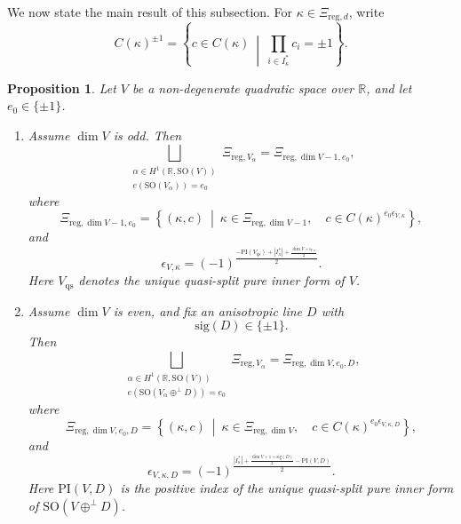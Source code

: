 \documentclass[12pt]{amsart}
\numberwithin{equation}{subsection}
\newcommand{\BR}{{\mathbb {R}}}
\newcommand{\Fi}{{\mathfrak {i}}}
\newcommand{\reg}{{\mathrm{reg}}}
\newcommand{\SO}{{\mathrm{SO}}}
\def\alp{{\alpha}}
\def\eps{{\epsilon}}
\def\qs{\mathrm{qs}}
\def\PI{\mathrm{PI}}
\def\SO{\mathrm{SO}}
\newtheorem{pro}[thm]{Proposition}
\begin{document}
We now state the main result of this subsection. For $\kappa\in \Xi_{\reg,d}$,
write
\[
C(\kappa)^{\pm 1}
=
\left\{
c\in C(\kappa)
\ \middle|\
\prod_{i\in I^*_\kappa}c_i=\pm 1
\right\}.
\]

\begin{pro}\label{pro:unionpureinnerconjclassof}
Let $V$ be a non-degenerate quadratic space over $\BR$, and let
$e_0\in \{\pm 1\}$.

\begin{enumerate}
\item
Assume $\dim V$ is odd. Then
\[
\bigsqcup_{\substack{
\alp\in H^1(\BR,\SO(V))\\
e(\SO(V_\alp))=e_0
}}
\Xi_{\reg,V_\alp}
=
\Xi_{\reg,\dim V-1,e_0},
\]
where
\[
\Xi_{\reg,\dim V-1,e_0}
=
\left\{
(\kappa,c)
\ \middle|\
\kappa\in \Xi_{\reg,\dim V-1},\quad
c\in C(\kappa)^{e_0\eps_{V,\kappa}}
\right\},
\]
and
\[
\eps_{V,\kappa}
=
(-1)^{
\frac{
-\PI(V_\qs)
+
|I^*_\kappa|
+
\frac{\dim V+\Fi_{V,\kappa}}{2}
}{2}
}.
\]
Here $V_\qs$ denotes the unique quasi-split pure inner form of $V$.

\item
Assume $\dim V$ is even, and fix an anisotropic line $D$ with
\[
\mathrm{sig}(D)\in \{\pm 1\}.
\]
Then
\[
\bigsqcup_{\substack{
\alp\in H^1(\BR,\SO(V))\\
e(\SO(V_\alp\oplus^\perp D))=e_0
}}
\Xi_{\reg,V_\alp}
=
\Xi_{\reg,\dim V,e_0,D},
\]
where
\[
\Xi_{\reg,\dim V,e_0,D}
=
\left\{
(\kappa,c)
\ \middle|\
\kappa\in \Xi_{\reg,\dim V},\quad
c\in C(\kappa)^{e_0\eps_{V,\kappa,D}}
\right\},
\]
and
\[
\eps_{V,\kappa,D}
=
(-1)^{
\frac{
|I^*_\kappa|
+
\frac{\dim V+1+\mathrm{sig}(D)}{2}
-
\PI(V,D)
}{2}
}.
\]
Here $\PI(V,D)$ is the positive index of the unique quasi-split pure inner form
of $\SO(V\oplus^\perp D)$.
\end{enumerate}
\end{pro}
\end{document}

